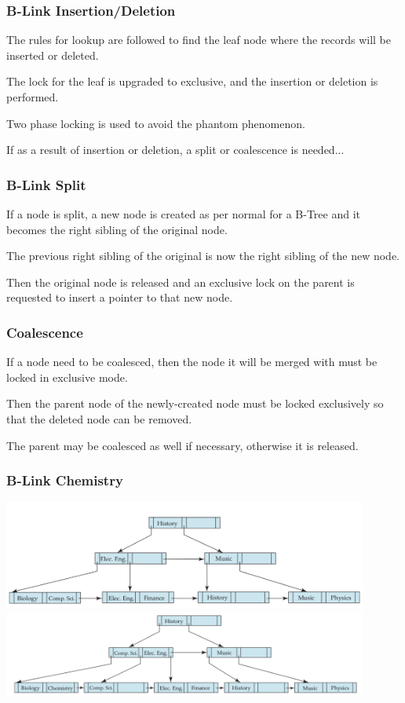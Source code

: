 \begin{frame}
\frametitle{B-Link Insertion/Deletion}

The rules for lookup are followed to find the leaf node where the records will be inserted or deleted. 

The lock for the leaf is upgraded to exclusive, and the insertion or deletion is performed. 

Two phase locking is used to avoid the phantom phenomenon.

If as a result of insertion or deletion, a split or coalescence is needed...

\end{frame}

\begin{frame}
\frametitle{B-Link Split}

If a node is split, a new node is created as per normal for a B-Tree and it becomes the right sibling of the original node. 

The previous right sibling of the original is now the right sibling of the new node. 

Then the original node is released and an exclusive lock on the parent is requested to insert a pointer to that new node.

\end{frame}

\begin{frame}
\frametitle{Coalescence}

If a node need to be coalesced, then the node it will be merged with must be locked in exclusive mode. 

Then the parent node of the newly-created node must be locked exclusively so that the deleted node can be removed. 

The parent may be coalesced as well if necessary, otherwise it is released.

\end{frame}

\begin{frame}
\frametitle{B-Link Chemistry}

\begin{center}
	\includegraphics[width=0.9\textwidth]{images/b-link1}
	\vspace{5em}
	\includegraphics[width=0.9\textwidth]{images/b-link2}
\end{center}


\end{frame}

